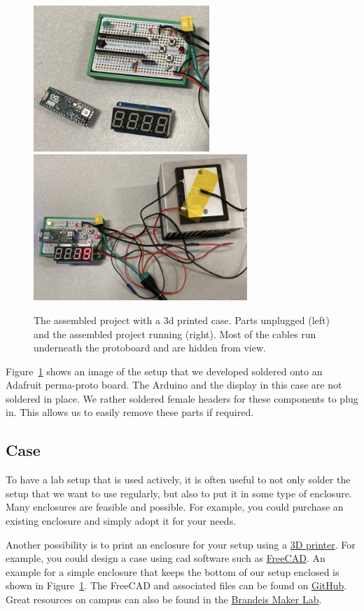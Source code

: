 \begin{figure}[tb]
  \centering
  \includegraphics[height=5.5cm]{graphics/06_outlook/final_parts.jpg}
  \includegraphics[height=5.5cm]{graphics/06_outlook/final_assembled.jpg}
  \caption{The assembled project with a 3d printed case. Parts unplugged (left) and the assembled project running (right). Most of the cables run underneath the protoboard and are hidden from view.}
  \label{fig:outlook:final_assembled}
\end{figure}
Figure~\ref{fig:outlook:final_assembled} shows an image of the setup that we developed soldered onto an Adafruit perma-proto board. The Arduino and the display in this case are not soldered in place. We rather soldered female headers for these components to plug in. This allows us to easily remove these parts if required.


\subsection{Case}

To have a lab setup that is used actively, it is often useful to not only solder the setup that we want to use regularly, but also to put it in some type of enclosure. Many enclosures are feasible and possible. For example, you could purchase an existing enclosure and simply adopt it for your needs. 

Another possibility is to print an enclosure for your setup using a \href{https://en.wikipedia.org/wiki/3D_printing}{3D printer}. For example, you could design a case using \ac{cad} software such as \href{https://www.freecad.org/}{FreeCAD}. An example for a simple enclosure that keeps the bottom of our setup enclosed is shown in Figure~\ref{fig:outlook:final_assembled}. The FreeCAD and associated files can be found on \href{https://github.com/galactic-forensics/workshop_arduino_electronics/tree/main/3d_files}{GitHub}. Great resources on campus can also be found in the \href{https://www.brandeis.edu/library/research-technology-innovation/makerlab.html}{Brandeis Maker Lab}.



